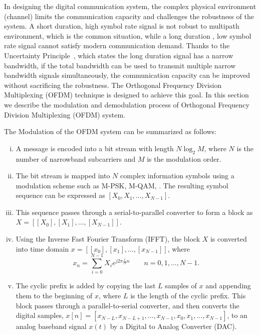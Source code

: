 In designing the digital communication system, the complex physical environment (channel) limits the communication capacity and challenges the robustness of the system. A short duration, high symbol rate signal is not robust to multipath environment, which is the common situation, while a long duration , low symbol rate signal cannot satisfy modern communication demand. Thanks to the Uncertainty Principle~\cite{BibEntry2021Dec}, which states the long duration signal has a narrow bandwidth, if the total bandwidth can be used to transmit multiple narrow bandwidth signals simultaneously, the communication capacity can be improved without sacrificing the robustness. The Orthogonal Frequency Division Multiplexing (OFDM) technique is designed to achieve this goal.
In this section we describe the modulation and demodulation process of Orthogonal Frequency Division Multiplexing (OFDM) system.

The Modulation of the OFDM system can be summarized as follows:
\begin{enumerate}[(i)]
    \item A message is encoded into a bit stream with length $N\log_2M$, where $N$ is the number of narrowband subcarriers and $M$ is the modulation order.
    \item The bit stream is mapped into $N$ complex information symbols using a modulation scheme such as M-PSK, M-QAM, \etc. The resulting symbol sequence can be expressed as $[X_{0}, X_{1}, \ldots, X_{N-1}]$.
    \item This sequence passes through a serial-to-parallel converter to form a block as $X = [[X_{0}], [X_{1}], \ldots, [X_{N-1}]]$.
    \item Using the Inverse Fast Fourier Transform (IFFT), the block $X$ is converted into time domain $x = [[x_0], [x_1], \allowbreak \ldots, [x_{N-1}]]$, where
    \begin{equation}
        \label{eq:IFFT}
        x_n = \sum_{i=0}^{N-1}X_i e^{j2\pi\frac{i}{N}n} \qquad n=0,1,\ldots,N-1.
    \end{equation}
    \item The cyclic prefix is added by copying the last $L$ samples of $x$ and appending them to the beginning of $x$, where $L$ is the length of the cyclic prefix. This block passes through a parallel-to-serial converter, and then converts the digital samples, $x[n] = [x_{N-L}, x_{N-L+1}, \ldots, x_{N-1}, x_0, x_1, \ldots, x_{N-1}]$, to an analog baseband signal $x(t)$ by a Digital to Analog Converter (DAC).
\end{enumerate}

